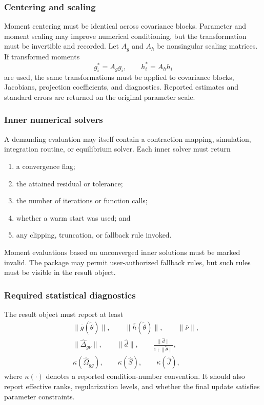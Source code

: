 \subsubsection{Centering and scaling}

Moment centering must be identical across covariance blocks. Parameter and
moment scaling may improve numerical conditioning, but the transformation must
be invertible and recorded. Let $A_g$ and $A_h$ be nonsingular scaling
matrices. If transformed moments
\[
 g_i^*=A_gg_i,
 \qquad
 h_i^*=A_hh_i
\]
are used, the same transformations must be applied to covariance blocks,
Jacobians, projection coefficients, and diagnostics. Reported estimates and
standard errors are returned on the original parameter scale.

\subsubsection{Inner numerical solvers}

A demanding evaluation may itself contain a contraction mapping, simulation,
integration routine, or equilibrium solver. Each inner solver must return
\begin{enumerate}
 \item a convergence flag;
 \item the attained residual or tolerance;
 \item the number of iterations or function calls;
 \item whether a warm start was used; and
 \item any clipping, truncation, or fallback rule invoked.
\end{enumerate}
Moment evaluations based on unconverged inner solutions must be marked invalid.
The package may permit user-authorized fallback rules, but such rules must be
visible in the result object.

\subsubsection{Required statistical diagnostics}

The result object must report at least
\begin{align*}
 &\|\overline g(\widetilde\theta)\|,
 \qquad
 \|\overline h(\widetilde\theta)\|,
 \qquad
 \|\overline\nu\|,\\
 &\|\widehat\Delta_{g\nu}\|,
 \qquad
 \|\widehat d\|,
 \qquad
 \frac{\|\widehat d\|}{1+\|\widetilde\theta\|},\\
 &\kappa(\widehat\Omega_{gg}),
 \qquad
 \kappa(\widehat S),
 \qquad
 \kappa(\widehat J),
\end{align*}
where $\kappa(\cdot)$ denotes a reported condition-number convention. It should
also report effective ranks, regularization levels, and whether the final update
satisfies parameter constraints.

